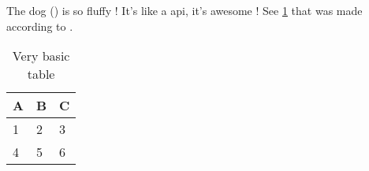 

The dog () is so fluffy !
It's like a \gls{api}, it's awesome ! See \cref{tab:abc} that was made according
to \textcite{einstein}.

\begin{table}[h]
    \centering
    \begin{tabular}{l | l | l}
        A & B & C \\
        \hline
        1 & 2 & 3 \\
        4 & 5 & 6
    \end{tabular}
    \caption{Very basic table}
    \label{tab:abc}
\end{table}

\lipsum[1-20]